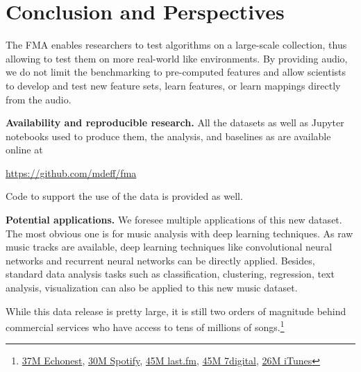 \documentclass{article}
\begin{document}
\section{Conclusion and Perspectives}


The FMA enables researchers to test algorithms on a large-scale collection, thus allowing to test them on more real-world like environments. By providing audio, we do not limit the benchmarking to pre-computed features and allow scientists to develop and test new feature sets, learn features, or learn mappings directly from the audio.

{\bf Availability and reproducible research.}
All the datasets as well as Jupyter notebooks used to produce them, the
analysis, and baselines as are available online at

\url{https://github.com/mdeff/fma}

Code to support the use of the data is provided as well.
 
{\bf Potential applications.}
We foresee multiple applications of this new dataset. The most obvious one is for music analysis with deep learning techniques. As raw music tracks are available, deep learning techniques like convolutional neural networks \cite{mnist} and recurrent neural networks \cite{art:HochreiterSchmidhuber97LSTM} can be directly applied. Besides, standard data analysis tasks such as classification, clustering, regression, text analysis, visualization can also be applied to this new music dataset.

While this data release is pretty large, it is still two orders of magnitude behind commercial services who have access to tens of millions of songs.\footnote{\href{http://the.echonest.com}{37M Echonest}, \href{https://en.wikipedia.org/wiki/Spotify}{30M Spotify}, \href{http://www.skilledtests.com/wiki/Last.fm_statistics}{45M last.fm}, \href{http://bupz.com/best-websites-to-buy-musics}{45M 7digital}, \href{https://www.apple.com/pr/library/2013/02/06iTunes-Store-Sets-New-Record-with-25-Billion-Songs-Sold.html}{26M iTunes}}
\end{document}
